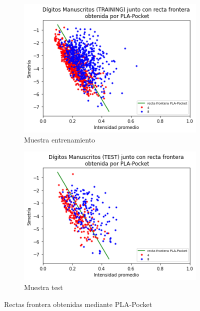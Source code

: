 \documentclass[11pt,a4paper]{article}
\theoremstyle{definition}
\begin{document}
	\begin{figure}[H]
		\centering
		\begin{subfigure}{.5\textwidth}
  		\centering
  		\includegraphics[width=1\textwidth]{images/bonus4}
  		\caption{Muestra entrenamiento}
  		\label{fig:sub1}
		\end{subfigure}%
		\begin{subfigure}{.5\textwidth}
  		\centering
  		\includegraphics[width=1\textwidth]{images/bonus5}
  		\caption{Muestra test}
  		\label{fig:sub2}
		\end{subfigure}
		\caption{Rectas frontera obtenidas mediante PLA-Pocket}
		\label{fig:test}
	\end{figure}
	
\end{document}
